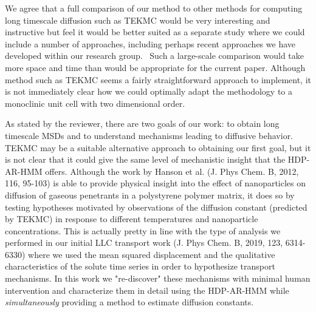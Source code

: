 \documentclass{article}
\begin{document}
\begin{enumerate}[label={Comment \theenumi :}, leftmargin=3.9\parindent]
    We agree that a full comparison of our method to other methods for computing long timescale 
    diffusion such as TEKMC would be very interesting and instructive but feel it would be better 
    suited as a separate study where we could include a number of approaches, including perhaps
    recent approaches we have developed within our research group.~\cite{coscia_capturing_2020}
    Such a large-scale comparison would take more space and time than would be appropriate for 
    the current paper. Although method such as TEKMC seems a fairly straightforward approach to
    implement, it is not immediately clear how we could optimally adapt the methodology to a 
    monoclinic unit cell with two dimensional order. 
    
    As stated by the reviewer, there are two goals of our work: to obtain long timescale MSDs and
    to understand mechanisms leading to diffusive behavior. TEKMC may be a suitable alternative 
    approach to obtaining our first goal, but it is not clear that it could give the same level
    of mechanistic insight that the HDP-AR-HMM offers. Although the work by Hanson et al.
    (J. Phys Chem. B, 2012, 116, 95-103) is able to provide physical insight into the effect of
    nanoparticles on diffusion of gaseous penetrants in a polystyrene polymer matrix, it does so
    by testing hypotheses motivated by observations of the diffusion constant (predicted by TEKMC)
    in response to different temperatures and nanoparticle concentrations. This is actually pretty
    in line with the type of analysis we performed in our initial LLC transport work (J. Phys Chem. B, 2019, 123, 6314-6330)
    where we used the mean squared displacement and the qualitative characteristics of the solute
    time series in order to hypothesize transport mechanisms. In this work we "re-discover" these
    mechanisms with minimal human intervention and characterize them in detail using the 
    HDP-AR-HMM while \textit{simultaneously} providing a method to estimate diffusion constants.
    



\end{enumerate}
\end{document}

